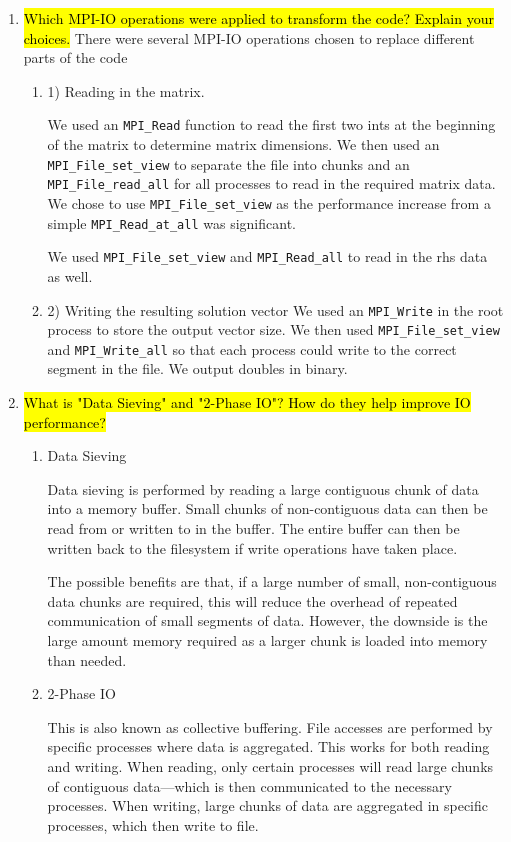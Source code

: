 \begin{enumerate}
  \item \hl{Which MPI-IO operations were applied to transform the code? Explain your choices.}
  There were several MPI-IO operations chosen to replace different parts of the code
  \begin{enumerate}
  \item 1) Reading in the matrix.
  
  We used an \verb!MPI_Read! function to read the first two ints at the beginning of the matrix to determine matrix dimensions. We then used an \verb!MPI_File_set_view! to separate the file into chunks and an \verb!MPI_File_read_all! for all processes to read in the required matrix data. We chose to use \verb!MPI_File_set_view! as the performance increase from a simple \verb!MPI_Read_at_all! was significant.
  
  We used \verb!MPI_File_set_view! and \verb!MPI_Read_all! to read in the rhs data as well.
  
  \item 2) Writing the resulting solution vector
  We used an \verb!MPI_Write! in the root process to store the output vector size. We then used \verb!MPI_File_set_view! and \verb!MPI_Write_all! so that each process could write to the correct segment in the file. We output doubles in binary.
  
  \end{enumerate}
  
  \item \hl{What is "Data Sieving" and "2-Phase IO"? How do they help improve IO
performance?}
	\begin{enumerate}
	\item Data Sieving
	
	Data sieving is performed by reading a large contiguous chunk of data into a memory buffer. Small chunks of non-contiguous data can then be read from or written to in the buffer. The entire buffer can then be written back to the filesystem if write operations have taken place.  
	
	The possible benefits are that, if a large number of small, non-contiguous data chunks are required, this will reduce the overhead of repeated communication of small segments of data. However, the downside is the large amount memory required as a larger chunk is loaded into memory than needed.
	
	\item 2-Phase IO
	
	This is also known as collective buffering. File accesses are performed by specific processes where data is aggregated. This works for both reading and writing. When reading, only certain processes will read large chunks of contiguous data---which is then communicated to the necessary processes. When writing, large chunks of data are aggregated in specific processes, which then write to file.
	

\end{enumerate}
\end{enumerate}
